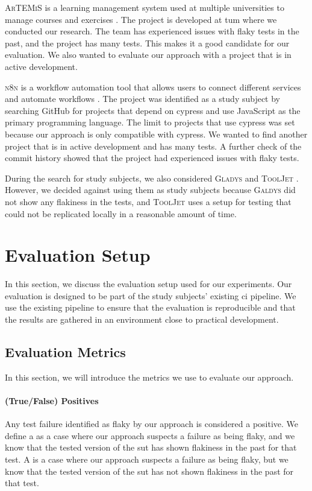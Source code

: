 \textsc{ArTEMiS} is a learning management system used at multiple universities to manage courses and exercises \autocite{krusche_artemis_2018}.
The project is developed at \ac{tum} where we conducted our research.
The team has experienced issues with flaky tests in the past, and the project has many tests.
This makes it a good candidate for our evaluation.
We also wanted to evaluate our approach with a project that is in active development.

\textsc{n8n} is a workflow automation tool that allows users to connect different services and automate workflows \autocite{noauthor_n8n_2023}.
The project was identified as a study subject by searching GitHub for projects that depend on cypress and use JavaScript as the primary programming language.
The limit to projects that use cypress was set because our approach is only compatible with cypress.
We wanted to find another project that is in active development and has many tests.
A further check of the commit history showed that the project had experienced issues with flaky tests.

During the search for study subjects, we also considered \textsc{Gladys} \autocite{noauthor_gladys_2023} and \textsc{ToolJet} \autocite{noauthor_tooljettooljet_2023}. However, we decided against using them as study subjects because \textsc{Galdys} did not show any flakiness in the tests, and \textsc{ToolJet} uses a setup for testing that could not be replicated locally in a reasonable amount of time.

\section{Evaluation Setup}
In this section, we discuss the evaluation setup used for our experiments.
Our evaluation is designed to be part of the study subjects' existing \ac{ci} pipeline.
We use the existing pipeline to ensure that the evaluation is reproducible and that the results are gathered in an environment close to practical development.

\subsection{Evaluation Metrics}
In this section, we will introduce the metrics we use to evaluate our approach.

\paragraph{(True/False) Positives} Any test failure identified as flaky by our approach is considered a positive.
We define a  as a case where our approach suspects a failure as being flaky, and we know that the tested version of the \ac{sut} has shown flakiness in the past for that test.
A  is a case where our approach suspects a failure as being flaky, but we know that the tested version of the \ac{sut} has not shown flakiness in the past for that test.

